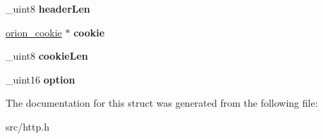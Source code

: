 \begin{DoxyCompactItemize}
\item 
\hypertarget{structorion__httpRequest_a63b5d516af47ebd4bc0301d0433fee74}{
\_\-uint8 {\bfseries headerLen}}
\label{structorion__httpRequest_a63b5d516af47ebd4bc0301d0433fee74}

\item 
\hypertarget{structorion__httpRequest_a9adba13db1d2db15bcd6636b2c01a5f2}{
\hyperlink{structorion__cookie}{orion\_\-cookie} $\ast$ {\bfseries cookie}}
\label{structorion__httpRequest_a9adba13db1d2db15bcd6636b2c01a5f2}

\item 
\hypertarget{structorion__httpRequest_ae76edadeb134faa75a7d8d0477748cad}{
\_\-uint8 {\bfseries cookieLen}}
\label{structorion__httpRequest_ae76edadeb134faa75a7d8d0477748cad}

\item 
\hypertarget{structorion__httpRequest_a4eb4a9c724a8e7452422d37ed58b1b22}{
\_\-uint16 {\bfseries option}}
\label{structorion__httpRequest_a4eb4a9c724a8e7452422d37ed58b1b22}

\end{DoxyCompactItemize}


The documentation for this struct was generated from the following file:\begin{DoxyCompactItemize}
\item 
src/http.h\end{DoxyCompactItemize}

